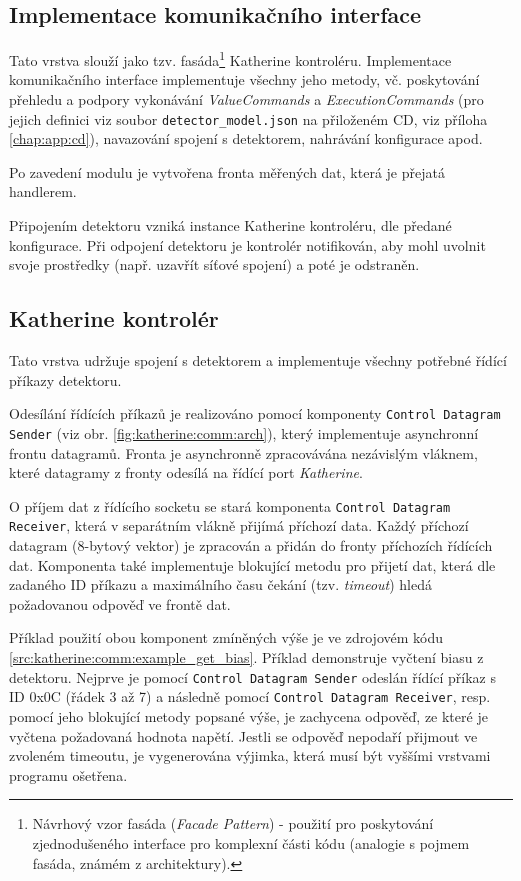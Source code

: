 \subsection{Implementace komunikačního interface}
Tato vrstva slouží jako tzv. fasáda\footnote{Návrhový vzor fasáda (\textit{Facade Pattern}) - použití pro poskytování zjednodušeného interface pro komplexní části kódu (analogie s pojmem fasáda, známém z architektury).} Katherine kontroléru. Implementace komunikačního interface implementuje všechny jeho metody, vč. poskytování přehledu a podpory vykonávání \textit{ValueCommands} a \textit{ExecutionCommands} (pro jejich definici viz soubor \texttt{detector\_model.json} na přiloženém CD, viz příloha \ref{chap:app:cd}), navazování spojení s detektorem, nahrávání konfigurace apod.

Po zavedení modulu je vytvořena fronta měřených dat, která je přejatá handlerem.

Připojením detektoru vzniká instance Katherine kontroléru, dle předané konfigurace. Při odpojení detektoru je kontrolér notifikován, aby mohl uvolnit svoje prostředky (např. uzavřít síťové spojení) a poté je odstraněn.

\subsection{Katherine kontrolér}
Tato vrstva udržuje spojení s detektorem a implementuje všechny potřebné řídící příkazy detektoru.

Odesílání řídících příkazů je realizováno pomocí komponenty \texttt{Control Datagram Sender} (viz obr. \ref{fig:katherine:comm:arch}), který implementuje asynchronní frontu datagramů. Fronta je asynchronně zpracovávána nezávislým vláknem, které datagramy z fronty odesílá na řídící port \textit{Katherine}.

O příjem dat z řídícího socketu se stará komponenta \texttt{Control Datagram Receiver}, která v separátním vlákně přijímá příchozí data. Každý příchozí datagram (8-bytový vektor) je zpracován a přidán do fronty příchozích řídících dat. Komponenta také implementuje blokující metodu pro přijetí dat, která dle zadaného ID příkazu a maximálního času čekání (tzv. \textit{timeout}) hledá požadovanou odpověď ve frontě dat.

Příklad použití obou komponent zmíněných výše je ve zdrojovém kódu \ref{src:katherine:comm:example_get_bias}. Příklad demonstruje vyčtení biasu z detektoru. Nejprve je pomocí \texttt{Control Datagram Sender} odeslán řídící příkaz s ID 0x0C (řádek 3 až 7) a následně pomocí \texttt{Control Datagram Receiver}, resp. pomocí jeho blokující metody popsané výše, je zachycena odpověď, ze které je vyčtena požadovaná hodnota napětí. Jestli se odpověď nepodaří přijmout ve zvoleném timeoutu, je vygenerována výjimka, která musí být vyššími vrstvami programu ošetřena.

